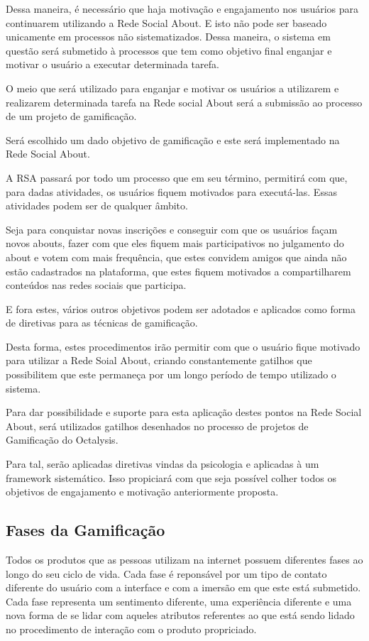 Dessa maneira, é necessário que haja motivação e engajamento nos usuários para 
continuarem utilizando a Rede Social About. E isto não pode ser baseado unicamente
em processos não sistematizados. Dessa maneira, o sistema em questão será
submetido à processos que tem como objetivo final enganjar e motivar o usuário
a executar determinada tarefa.

O meio que será utilizado para enganjar e motivar os usuários a utilizarem e
realizarem determinada tarefa na Rede social About será a submissão ao processo
de um projeto de gamificação. 

Será escolhido um dado objetivo de gamificação e este será implementado na Rede
Social About.

A RSA passará por todo um processo que em seu término, permitirá com que,
para dadas atividades, os usuários fiquem motivados para executá-las. Essas
atividades podem ser de qualquer âmbito. 

Seja para conquistar novas inscrições e
conseguir com que os usuários façam novos abouts, fazer com que eles fiquem mais
participativos no julgamento do about e votem com mais frequência, que estes
convidem amigos que ainda não estão cadastrados na plataforma, que estes fiquem
motivados a compartilharem conteúdos nas redes sociais que participa.

E fora
estes, vários outros  objetivos podem ser adotados e aplicados como forma
de diretivas para as técnicas de gamificação.

Desta forma, estes procedimentos irão permitir com que o usuário fique motivado
para utilizar a Rede Soial About, criando constantemente gatilhos que possibilitem
que este permaneça por um longo período de tempo utilizado o sistema.

Para dar possibilidade e suporte para esta aplicação destes pontos na Rede
Social About, será utilizados gatilhos desenhados no processo de projetos
de Gamificação do Octalysis.

Para tal, serão aplicadas diretivas vindas da psicologia e aplicadas à um
framework sistemático. Isso propiciará com que seja possível colher
todos os objetivos de engajamento e motivação anteriormente proposta.

\subsection{Fases da Gamificação}
\label{sub:fasesgamification}
Todos os produtos que as pessoas utilizam na internet possuem diferentes
fases ao longo do seu ciclo de vida. Cada fase é reponsável por um tipo de contato diferente 
do usuário com a interface e com a imersão em que este está submetido.
Cada fase representa um sentimento diferente, uma experiência diferente
e uma nova forma de se lidar com aqueles atributos referentes ao que está
sendo lidado no procedimento de interação com o produto propriciado.

